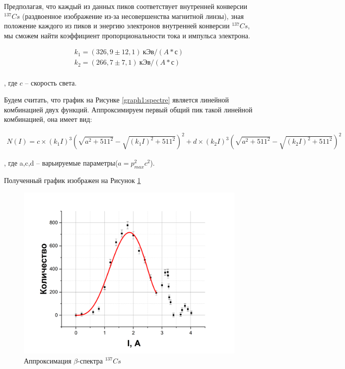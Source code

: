 \documentclass[a4paper,12pt]{article}
\begin{document}
\pagebreak

Предполагая, что каждый из данных пиков соответствует внутренней конверсии $^{137}Cs$ (раздвоенное изображение из-за несовершенства магнитной линзы), зная положение каждого из пиков и энергию электронов внутренней конверсии $^{137}Cs$, мы сможем найти коэффициент пропорциональности тока и импульса электрона.

\begin{align*}
	k_1 = (326,9 \pm 12,1) \ кЭв / (A*с) \\
	k_2 = (266,7 \pm 7,1) \ кЭв / (A*с) \\
\end{align*}

, где $c$ -- скорость света.

Будем считать, что график на Рисунке \ref{graph1:spectre} является линейной комбинацией двух функций. Аппроксимируем первый общий пик такой линейной комбинацией, она имеет вид:

\begin{align} \label{eq2:exp_func}
	N(I) = c \times (k_1 I)^3 \left( \sqrt{a^2 + 511^2}-\sqrt{(k_1 I)^2 + 511^2} \right)^2 + d \times (k_2 I)^3 \left(\sqrt{a^2+511^2} -\sqrt{(k_2 I)^2 + 511^2}\right)^2 
\end{align}

, где a,c,d -- варьируемые параметры($a = p^2_{max}c^2$).

Полученный график изображен на Рисунок \ref{graph4:spectre_approx}


\begin{figure}[h!]
	\centering
	\includegraphics[width=\linewidth]{graph4 (spectre_approx_3)}
	\caption{Аппроксимация $\beta$-спектра $^{137}Cs$}
	\label{graph4:spectre_approx}
\end{figure}
\end{document}
